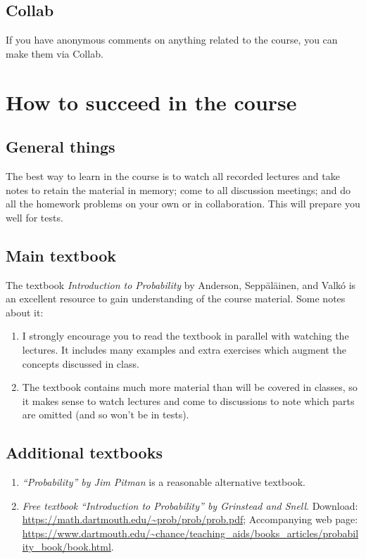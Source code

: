 \documentclass[oneside,11pt]{amsart}
\begin{document}
\subsection{Collab}
\label{sub:collab}
If you have anonymous comments on anything related to the course, you can make
them via Collab.

\section{How to succeed in the course}
\label{success}

\subsection{General things}

The best way to learn in the course is to 
watch all recorded lectures and take notes to retain the material in memory; 
come to all discussion meetings;
and do all the homework problems on your own or in collaboration.
This will prepare you well for tests.

\subsection{Main textbook}

The textbook \emph{Introduction to Probability} by Anderson, Sepp\"al\"ainen, and Valk\'o 
is 
an excellent resource 
to gain understanding of the course material. Some notes about it:

\begin{enumerate}[$\bullet$]
	\item I strongly encourage you to read the textbook in parallel with watching the lectures. 
		It includes many examples and
		extra exercises which augment the concepts discussed in class.
	\item The textbook contains much more material than will be covered in classes, so it
		makes sense to watch lectures and come to discussions to note which parts are omitted
		(and so won't be in tests).
\end{enumerate}

\subsection{Additional textbooks}

\begin{enumerate}
	\item 
		\emph{``Probability'' by Jim Pitman} is a reasonable alternative textbook.
	\item 
		\emph{Free textbook} 
		\emph{``Introduction to Probability'' by Grinstead and Snell}.
			Download: \url{https://math.dartmouth.edu/~prob/prob/prob.pdf};
			Accompanying web page: \url{https://www.dartmouth.edu/~chance/teaching_aids/books_articles/probability_book/book.html}.
\end{enumerate}
\end{document}

